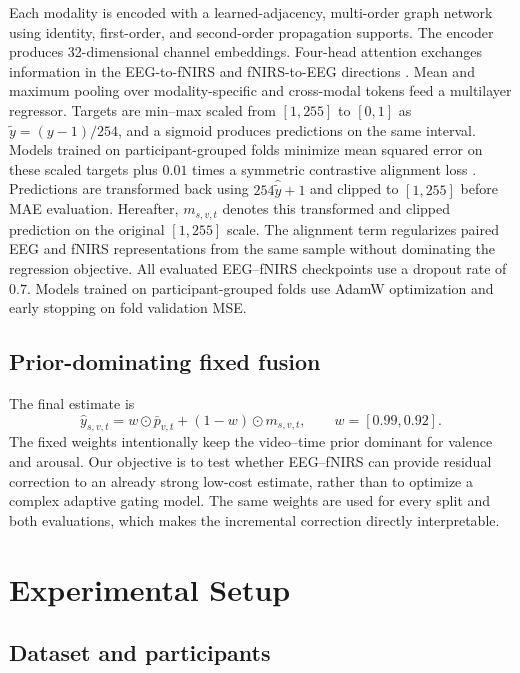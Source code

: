 Each modality is encoded with a learned-adjacency, multi-order graph network
using identity, first-order, and second-order propagation supports. The encoder
produces 32-dimensional channel embeddings. Four-head attention exchanges
information in the EEG-to-fNIRS and fNIRS-to-EEG directions
\cite{vaswani2017attention,tsai2019multimodal}. Mean and maximum pooling over
modality-specific and cross-modal tokens feed a multilayer regressor. Targets
are min--max scaled from \([1,255]\) to \([0,1]\) as
\(\tilde y=(y-1)/254\), and a sigmoid produces predictions on the same interval.
Models trained on participant-grouped folds minimize mean squared error on
these scaled targets plus \(0.01\) times a symmetric contrastive alignment loss
\cite{chen2020simclr}. Predictions are transformed back using
\(254\hat{\tilde y}+1\) and clipped to \([1,255]\) before MAE evaluation. Hereafter, \(m_{s,v,t}\) denotes this transformed and clipped prediction on
the original \([1,255]\) scale. The alignment term regularizes paired EEG and
fNIRS representations from the same sample without dominating the regression
objective. All evaluated EEG--fNIRS checkpoints use a dropout rate of \(0.7\).
Models trained on participant-grouped folds use AdamW optimization and early
stopping on fold validation MSE.

\subsection{Prior-dominating fixed fusion}

The final estimate is
\begin{equation}
 \hat y_{s,v,t}
 = w\odot \bar p_{v,t} + (1-w)\odot m_{s,v,t},
 \qquad w=[0.99,0.92].
\end{equation}
The fixed weights intentionally keep the video--time prior dominant for valence
and arousal. Our objective is to test whether EEG--fNIRS can provide residual
correction to an already strong low-cost estimate, rather than to optimize a
complex adaptive gating model. The same weights are used for every split and
both evaluations, which makes the incremental correction directly
interpretable.

\section{Experimental Setup}
\label{sec:setup}

\subsection{Dataset and participants}


